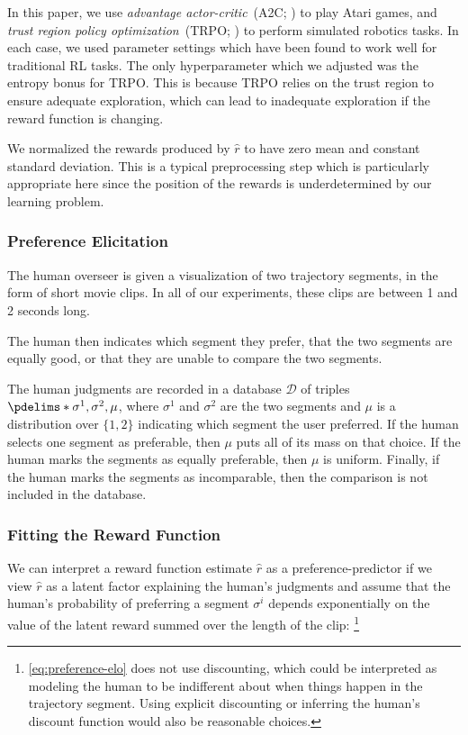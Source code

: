 In this paper, we use \emph{advantage actor-critic}~(A2C; \citealp{Mnih16}) to play Atari games, and \emph{trust region policy optimization}~(TRPO; \citealp{Schulman15})
to perform simulated robotics tasks. In each case, we used parameter settings which have been found to work well for traditional RL tasks. The only hyperparameter which we adjusted was the entropy bonus for TRPO. This is because TRPO relies on the trust region to ensure adequate exploration, which can lead to inadequate exploration if the reward function is changing.

We normalized the rewards produced by $\hat{r}$ to have zero mean and constant standard deviation. This is a typical preprocessing step which is particularly appropriate here since the position of the rewards is underdetermined by our learning problem.

\subsubsection{Preference Elicitation}

The human overseer is given a visualization of two trajectory segments, in the form of short movie clips. In all of our experiments, these clips are between 1 and 2 seconds long.

The human then indicates which segment they prefer, that the two segments are equally good, or that they are unable to compare the two segments.

The human judgments are recorded in a database $\mathcal{D}$ of triples $\pdelims*{\sigma^1, \sigma^2, \mu}$,
where $\sigma^1$ and  $\sigma^2$ are the two segments and $\mu$ is a distribution over $\{ 1, 2 \}$ indicating which segment the user preferred. If the human selects one segment as preferable, then $\mu$ puts all of its mass on that choice. If the human marks the segments as equally preferable, then $\mu$ is uniform. Finally, if the human marks the segments as incomparable, then the comparison is not included in the database.

\subsubsection{Fitting the Reward Function}
\label{ssec:fitting-reward-function}

We can interpret a reward function estimate $\hat{r}$ as a preference-predictor if we view $\hat{r}$ as a latent factor explaining the human's judgments and assume that the human's probability of preferring a segment $\sigma^i$ depends exponentially on the value of the latent reward summed over the length of the clip:
\footnote{\autoref{eq:preference-elo} does not use discounting, which could be interpreted as modeling the human to be indifferent about when things happen in the trajectory segment. Using explicit discounting or inferring the human's discount function would also be reasonable choices.}


